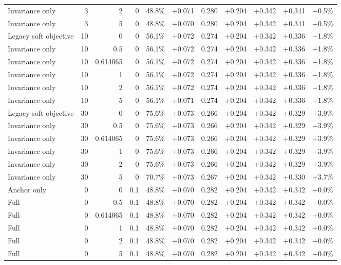 \begin{table}[htbp]
\begin{tabular}{lrrrccccccc}
Invariance only & 3 & 2 & 0 & 48.8\% & +0.071 & 0.280 & +0.204 & +0.342 & +0.341 & +0.5\% \\
Invariance only & 3 & 5 & 0 & 48.8\% & +0.070 & 0.280 & +0.204 & +0.342 & +0.341 & +0.5\% \\
Legacy soft objective & 10 & 0 & 0 & 56.1\% & +0.072 & 0.274 & +0.204 & +0.342 & +0.336 & +1.8\% \\
Invariance only & 10 & 0.5 & 0 & 56.1\% & +0.072 & 0.274 & +0.204 & +0.342 & +0.336 & +1.8\% \\
Invariance only & 10 & 0.614065 & 0 & 56.1\% & +0.072 & 0.274 & +0.204 & +0.342 & +0.336 & +1.8\% \\
Invariance only & 10 & 1 & 0 & 56.1\% & +0.072 & 0.274 & +0.204 & +0.342 & +0.336 & +1.8\% \\
Invariance only & 10 & 2 & 0 & 56.1\% & +0.072 & 0.274 & +0.204 & +0.342 & +0.336 & +1.8\% \\
Invariance only & 10 & 5 & 0 & 56.1\% & +0.071 & 0.274 & +0.204 & +0.342 & +0.336 & +1.8\% \\
Legacy soft objective & 30 & 0 & 0 & 75.6\% & +0.073 & 0.266 & +0.204 & +0.342 & +0.329 & +3.9\% \\
Invariance only & 30 & 0.5 & 0 & 75.6\% & +0.073 & 0.266 & +0.204 & +0.342 & +0.329 & +3.9\% \\
Invariance only & 30 & 0.614065 & 0 & 75.6\% & +0.073 & 0.266 & +0.204 & +0.342 & +0.329 & +3.9\% \\
Invariance only & 30 & 1 & 0 & 75.6\% & +0.073 & 0.266 & +0.204 & +0.342 & +0.329 & +3.9\% \\
Invariance only & 30 & 2 & 0 & 75.6\% & +0.073 & 0.266 & +0.204 & +0.342 & +0.329 & +3.9\% \\
Invariance only & 30 & 5 & 0 & 70.7\% & +0.073 & 0.267 & +0.204 & +0.342 & +0.330 & +3.7\% \\
Anchor only & 0 & 0 & 0.1 & 48.8\% & +0.070 & 0.282 & +0.204 & +0.342 & +0.342 & +0.0\% \\
Full & 0 & 0.5 & 0.1 & 48.8\% & +0.070 & 0.282 & +0.204 & +0.342 & +0.342 & +0.0\% \\
Full & 0 & 0.614065 & 0.1 & 48.8\% & +0.070 & 0.282 & +0.204 & +0.342 & +0.342 & +0.0\% \\
Full & 0 & 1 & 0.1 & 48.8\% & +0.070 & 0.282 & +0.204 & +0.342 & +0.342 & +0.0\% \\
Full & 0 & 2 & 0.1 & 48.8\% & +0.070 & 0.282 & +0.204 & +0.342 & +0.342 & +0.0\% \\
Full & 0 & 5 & 0.1 & 48.8\% & +0.070 & 0.282 & +0.204 & +0.342 & +0.342 & +0.0\% \\

\end{tabular}
\end{table}

